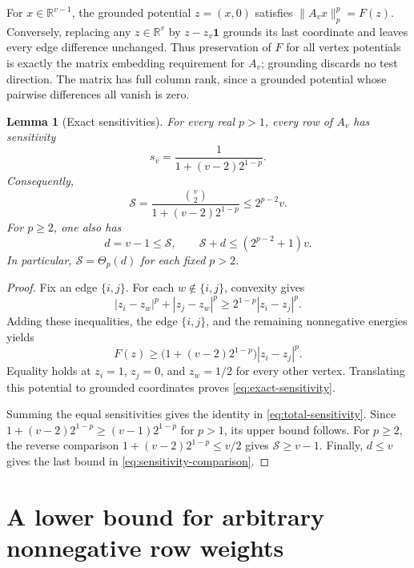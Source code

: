 \documentclass[11pt]{article}
\theoremstyle{spaced}
\newtheorem{lemma}[theorem]{Lemma}
\numberwithin{equation}{section}
\newcommand{\R}{\mathbb{R}}
\newcommand{\Sp}{\mathcal{S}}
\newcommand{\one}{\mathbf{1}}
\begin{document}
For $x\in\R^{v-1}$, the grounded potential $z=(x,0)$ satisfies
$\|A_vx\|_p^p=F(z)$. Conversely, replacing any $z\in\R^v$ by
$z-z_v\one$ grounds its last coordinate and leaves every edge difference
unchanged. Thus preservation of $F$ for all vertex potentials is
exactly the matrix embedding requirement for $A_v$; grounding discards
no test direction. The matrix has full column rank, since a grounded
potential whose pairwise differences all vanish is zero.

\begin{lemma}[Exact sensitivities]\label{lem:sensitivity}
For every real $p>1$, every row of $A_v$ has sensitivity
\begin{equation}\label{eq:exact-sensitivity}
 s_v=\frac{1}{1+(v-2)2^{1-p}}.
\end{equation}
Consequently,
\begin{equation}\label{eq:total-sensitivity}
 \Sp=\frac{\binom v2}{1+(v-2)2^{1-p}}
 \le 2^{p-2}v.
\end{equation}
For $p\ge2$, one also has
\begin{equation}\label{eq:sensitivity-comparison}
 d=v-1\le\Sp,
 \qquad
 \Sp+d\le(2^{p-2}+1)v.
\end{equation}
In particular, $\Sp=\Theta_p(d)$ for each fixed $p>2$.
\end{lemma}

\begin{proof}
Fix an edge $\{i,j\}$. For each $w\notin\{i,j\}$, convexity gives
\[
 |z_i-z_w|^p+|z_j-z_w|^p
 \ge 2^{1-p}|z_i-z_j|^p.
\]
Adding these inequalities, the edge $\{i,j\}$, and the remaining
nonnegative energies yields
\[
 F(z)\ge\bigl(1+(v-2)2^{1-p}\bigr)|z_i-z_j|^p.
\]
Equality holds at $z_i=1$, $z_j=0$, and $z_w=1/2$ for every other
vertex. Translating this potential to grounded coordinates proves
\eqref{eq:exact-sensitivity}.

Summing the equal sensitivities gives the identity in
\eqref{eq:total-sensitivity}. Since
$1+(v-2)2^{1-p}\ge(v-1)2^{1-p}$ for $p>1$, its upper bound follows.
For $p\ge2$, the reverse comparison
$1+(v-2)2^{1-p}\le v/2$ gives $\Sp\ge v-1$.
Finally, $d\le v$ gives the last bound in
\eqref{eq:sensitivity-comparison}.
\end{proof}

\section{A lower bound for arbitrary nonnegative row weights}
\label{sec:weighted}
\end{document}
